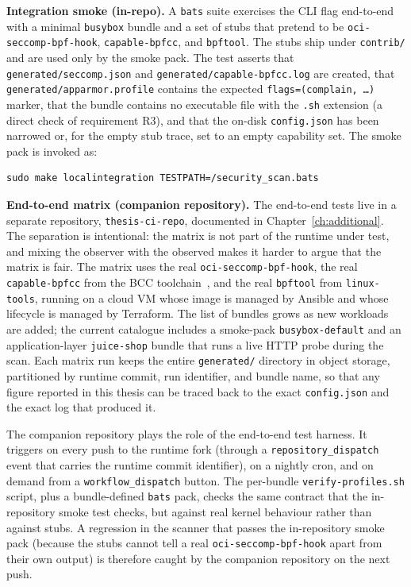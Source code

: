 \textbf{Integration smoke (in-repo).} A \texttt{bats} suite exercises the CLI flag end-to-end with a minimal \texttt{busybox} bundle and a set of stubs that pretend to be \texttt{oci-seccomp-bpf-hook}, \texttt{capable-bpfcc}, and \texttt{bpftool}. The stubs ship under \texttt{contrib/} and are used only by the smoke pack. The test asserts that \texttt{generated/seccomp.json} and \texttt{generated/capable-bpfcc.log} are created, that \texttt{generated/apparmor.profile} contains the expected \texttt{flags=(complain, \ldots)} marker, that the bundle contains no executable file with the \texttt{.sh} extension (a direct check of requirement R3), and that the on-disk \texttt{config.json} has been narrowed or, for the empty stub trace, set to an empty capability set. The smoke pack is invoked as:

\begin{verbatim}
sudo make localintegration TESTPATH=/security_scan.bats
\end{verbatim}

\textbf{End-to-end matrix (companion repository).} The end-to-end tests live in a separate repository, \texttt{thesis-ci-repo}, documented in Chapter~\ref{ch:additional}. The separation is intentional: the matrix is not part of the runtime under test, and mixing the observer with the observed makes it harder to argue that the matrix is fair. The matrix uses the real \texttt{oci-seccomp-bpf-hook}, the real \texttt{capable-bpfcc} from the BCC toolchain~\cite{bcc2025}, and the real \texttt{bpftool} from \texttt{linux-tools}, running on a cloud VM whose image is managed by Ansible and whose lifecycle is managed by Terraform. The list of bundles grows as new workloads are added; the current catalogue includes a smoke-pack \texttt{busybox-default} and an application-layer \texttt{juice-shop} bundle that runs a live HTTP probe during the scan. Each matrix run keeps the entire \texttt{generated/} directory in object storage, partitioned by runtime commit, run identifier, and bundle name, so that any figure reported in this thesis can be traced back to the exact \texttt{config.json} and the exact log that produced it.

The companion repository plays the role of the end-to-end test harness. It triggers on every push to the runtime fork (through a \texttt{repository\_dispatch} event that carries the runtime commit identifier), on a nightly cron, and on demand from a \texttt{workflow\_dispatch} button. The per-bundle \texttt{verify-profiles.sh} script, plus a bundle-defined \texttt{bats} pack, checks the same contract that the in-repository smoke test checks, but against real kernel behaviour rather than against stubs. A regression in the scanner that passes the in-repository smoke pack (because the stubs cannot tell a real \texttt{oci-seccomp-bpf-hook} apart from their own output) is therefore caught by the companion repository on the next push.

